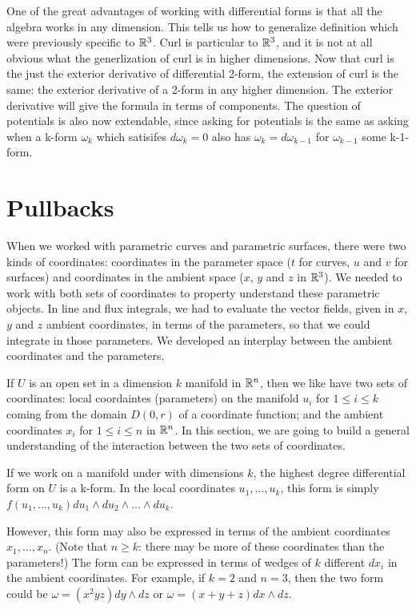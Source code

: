 \documentclass[fleqn,letterpaper]{report}
\begin{document}
One of the great advantages of working with differential forms
is that all the algebra works in any dimension. This tells us
how to generalize definition which were previously specific to
$\mathbb{R}^3$. Curl is
particular to $\mathbb{R}^3$, and it is not at all obvious what the
generlization of curl is in higher dimensions. Now that curl
is the just the exterior derivative of differential 2-form, the
extension of curl is the same: the exterior derivative of a
2-form in any higher dimension. The exterior derivative will
give the formula in terms of components. The question of
potentials is also now extendable, since asking for potentials
is the same as asking when a k-form $\omega_k$ which satisifes
$d\omega_k = 0 $ also has $\omega_k = d \omega_{k-1}$ for
$\omega_{k-1}$ some k-1-form.

\section{Pullbacks}
\label{pullbacks}

When we worked with parametric curves and parametric surfaces,
there were two kinds of coordinates: coordinates in the
parameter space ($t$ for curves, $u$ and $v$ for surfaces) and
coordinates in the ambient space ($x$, $y$ and $z$ in
$\mathbb{R}^3$). We needed to work with both sets of coordinates to
property understand these parametric objects. In line and flux
integrals, we had to evaluate the vector fields, given in $x$,
$y$ and $z$ ambient coordinates, in terms of the parameters,
so that we could integrate in those parameters. We developed
an interplay between the ambient coordinates and the
parameters.

If $U$ is an open set in a dimension $k$ manifold in
$\mathbb{R}^n$, then we like have two sets of coordinates: local
coordaintes (parameters) on the manifold $u_i$ for $1 \leq i \leq k$
coming from the domain $D(0,r)$ of a coordinate function; and
the ambient coordinates $x_i$ for $1 \leq i \leq n$ in
$\mathbb{R}^n$. In this section, we are going to build a general
understanding of the interaction between the two sets of
coordinates. 

If we work on a manifold under with dimensions $k$, the
highest degree differential form on $U$ is a k-form. In the
local coordinates $u_1, \ldots, u_k$, this form is simply
$f(u_1, \ldots, u_k) du_1 \wedge du_2 \wedge \ldots \wedge
du_k$. 

However, this form may also be expressed in terms of the
ambient coordinates $x_1, \ldots, x_n$. (Note that $n \geq k$:
there may be more of these coordinates than the parameters!)
The form can be expressed in terms of wedges of
$k$ different $dx_i$ in the ambient coordinates. For example,
if $k=2$ and $n=3$, then the two form could be $\omega =
(x^2yz) dy \wedge dz$ or $\omega = (x+y+z) dx \wedge dz$. 
\end{document}
